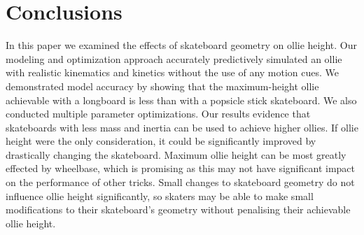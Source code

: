 \documentclass[default,iicol]{sn-jnl}
\begin{document}

\section{Conclusions}
In this paper we examined the effects of skateboard geometry on ollie height.
Our modeling and optimization approach accurately predictively simulated an ollie with realistic kinematics and kinetics without the use of any motion cues.
We demonstrated model accuracy by showing that the maximum-height ollie achievable with a longboard is less than with a popsicle stick skateboard.
We also conducted multiple parameter optimizations.
Our results evidence that skateboards with less mass and inertia can be used to achieve higher ollies.
If ollie height were the only consideration, it could be significantly improved by drastically changing the skateboard.
Maximum ollie height can be most greatly effected by wheelbase, which is promising as this may not have significant impact on the performance of other tricks.
Small changes to skateboard geometry do not influence ollie height significantly, so skaters may be able to make small modifications to their skateboard's geometry without penalising their achievable ollie height.
\end{document}
